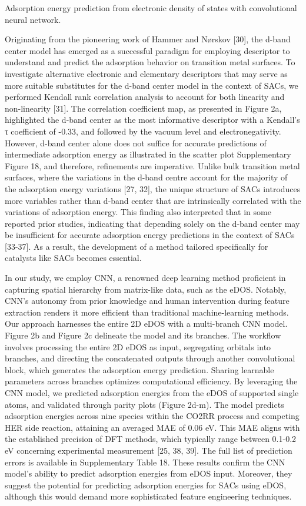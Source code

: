 Adsorption energy prediction from electronic density of states with convolutional neural network.

Originating from the pioneering work of Hammer and Nørskov [30], the d-band center model has emerged as a successful paradigm for employing descriptor to understand and predict the adsorption behavior on transition metal surfaces. To investigate alternative electronic and elementary descriptors that may serve as more suitable substitutes for the d-band center model in the context of SACs, we performed Kendall rank correlation analysis to account for both linearity and non-linearity [31]. The correlation coefficient map, as presented in Figure 2a, highlighted the d-band center as the most informative descriptor with a Kendall’s τ coefficient of -0.33, and followed by the vacuum level and electronegativity. However, d-band center alone does not suffice for accurate predictions of intermediate adsorption energy as illustrated in the scatter plot Supplementary Figure 18, and therefore, refinements are imperative. Unlike bulk transition metal surfaces, where the variations in the d-band centre account for the majority of the adsorption energy variations [27, 32], the unique structure of SACs introduces more variables rather than d-band center that are intrinsically correlated with the variations of adsorption energy. This finding also interpreted that in some reported prior studies, indicating that depending solely on the d-band center may be insufficient for accurate adsorption energy predictions in the context of SACs [33-37]. As a result, the development of a method tailored specifically for catalysts like SACs becomes essential.

In our study, we employ CNN, a renowned deep learning method proficient in capturing spatial hierarchy from matrix-like data, such as the eDOS. Notably, CNN’s autonomy from prior knowledge and human intervention during feature extraction renders it more efficient than traditional machine-learning methods. Our approach harnesses the entire 2D eDOS with a multi-branch CNN model. Figure 2b and Figure 2c delineate the model and its branches. The workflow involves processing the entire 2D eDOS as input, segregating orbitals into branches, and directing the concatenated outputs through another convolutional block, which generates the adsorption energy prediction. Sharing learnable parameters across branches optimizes computational efficiency. By leveraging the CNN model, we predicted adsorption energies from the eDOS of supported single atoms, and validated through parity plots (Figure 2d-m). The model predicts adsorption energies across nine species within the CO2RR process and competing HER side reaction, attaining an averaged MAE of 0.06 eV. This MAE aligns with the established precision of DFT methods, which typically range between 0.1-0.2 eV concerning experimental measurement [25, 38, 39]. The full list of prediction errors is available in Supplementary Table 18. These results confirm the CNN model’s ability to predict adsorption energies from eDOS input. Moreover, they suggest the potential for predicting adsorption energies for SACs using eDOS, although this would demand more sophisticated feature engineering techniques.

